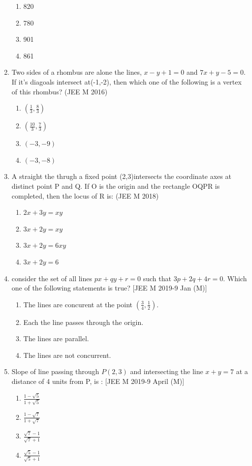 \documentclass[12pt]{article}
\providecommand{\brak}[1]{\ensuremath{\left(#1\right)}}
\begin{document}
\begin{enumerate}
\begin{enumerate}
\item 820 
\item 780 
\item 901 
\item 861
\end{enumerate}
\item Two sides  of a rhombus are alone the lines, $x-y+1=0$ and $7x+y-5=0$. If it's diagoals intersect at(-1,-2), then which one of the following is a vertex of this rhombus? (JEE M 2016)
\begin{enumerate}
\item $\brak{\frac{1}{3},\frac{8}{3}}$ 
\item $\brak{\frac{10}{3},\frac{7}{3}}$ 
\item $\brak{-3,-9}$ 
\item $\brak{-3,-8}$
\end{enumerate}
\item A straight the thrugh a fixed point (2,3)intersects the coordinate axes at distinct point P  and Q. If O is the origin and the rectangle OQPR is completed, then the locus of R is: (JEE M 2018)
\begin{enumerate}
\item $2x+3y=xy$ 
\item $3x+2y=xy$ 
\item $3x+2y=6xy$ 
\item $3x+2y=6$
\end{enumerate}
\item consider the set of all lines $px+qy+r=0$ such that $3p+2q+4r=0$. Which one of the following statements is true? [JEE M 2019-9 Jan (M)]
\begin{enumerate}
\item The lines are concurent at the point $\brak{\frac{3}{4},\frac{1}{2}} $.
\item Each the line passes through the origin.
\item The lines are parallel.
\item The lines are not concurrent.
\end{enumerate}
\item Slope of line passing through $P(2,3)$ and intersecting the line $x+y=7$ at a distance of 4 units from  P,  is : [JEE M 2019-9 April (M)]
\begin{enumerate}
\item $\frac{1-\sqrt{5}}{1+\sqrt{5}}$
\item $\frac{1-\sqrt{7}}{1+\sqrt{7}}$
\item $\frac{\sqrt{7}-1}{\sqrt{7}+1}$
\item $\frac{\sqrt{5}-1}{\sqrt{5}+1}$
\end{enumerate}
\end{enumerate}
\end{document}
